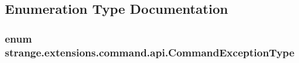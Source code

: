 \subsection{Enumeration Type Documentation}
\hypertarget{namespacestrange_1_1extensions_1_1command_1_1api_a27c9226cc8d55624f3294319d48879e3}{
\subsubsection[{Command\-Exception\-Type}]{\setlength{\rightskip}{0pt plus 5cm}enum {\bf strange.\-extensions.\-command.\-api.\-Command\-Exception\-Type}}}\label{namespacestrange_1_1extensions_1_1command_1_1api_a27c9226cc8d55624f3294319d48879e3}

